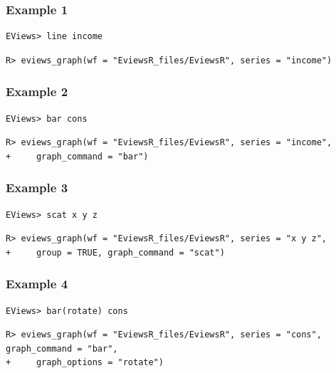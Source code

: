 \hypertarget{example-1}{%
\subsubsection{Example 1}\label{example-1}}

\begin{verbatim}
EViews> line income
\end{verbatim}

\begin{verbatim}
R> eviews_graph(wf = "EviewsR_files/EviewsR", series = "income")
\end{verbatim}

\hypertarget{example-2}{%
\subsubsection{Example 2}\label{example-2}}

\begin{verbatim}
EViews> bar cons
\end{verbatim}

\begin{verbatim}
R> eviews_graph(wf = "EviewsR_files/EviewsR", series = "income",
+     graph_command = "bar")
\end{verbatim}

\hypertarget{example-3}{%
\subsubsection{Example 3}\label{example-3}}

\begin{verbatim}
EViews> scat x y z
\end{verbatim}

\begin{verbatim}
R> eviews_graph(wf = "EviewsR_files/EviewsR", series = "x y z",
+     group = TRUE, graph_command = "scat")
\end{verbatim}

\hypertarget{example-4}{%
\subsubsection{Example 4}\label{example-4}}

\begin{verbatim}
EViews> bar(rotate) cons
\end{verbatim}

\begin{verbatim}
R> eviews_graph(wf = "EviewsR_files/EviewsR", series = "cons", graph_command = "bar",
+     graph_options = "rotate")
\end{verbatim}

